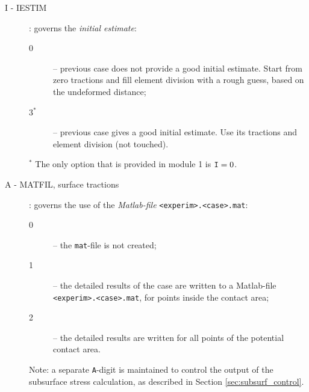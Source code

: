 \documentclass[12pt]{report}
\renewcommand{\magenta}[1]{}
\begin{document}
\begin{description}
\item[I - IESTIM] \label{i-digit} : governs the {\em initial estimate\/}:
\begin{description}
\item[0] -- previous case does not provide a good initial estimate. Start
        from zero tractions and fill element division with a rough guess,
        based on the undeformed distance;
\magenta{
\item[1$^*$] -- use previous solution, regularize tractions. The element
        division of the previous case is used as initial estimate, and the
        tractions are adjusted to this state;
\item[2$^*$] -- use normal part of previous case only. The normal tractions are
        maintained, but all elements start with zero tangential tractions,
        in the adhesion area;
}
\item[3$^*$] -- previous case gives a good initial estimate. Use its tractions
        and element division (not touched).
\end{description}
$^*$ The only option that is provided in module 1 is ${\tt I}=0$.

\item[A - MATFIL, surface tractions] \label{a-digit} : governs the use of
        the {\em Matlab-file\/} {\tt <experim>.\-<case>\-.mat}:
\begin{description}
\item[0] -- the {\tt mat}-file is not created;
\item[1] -- the detailed results of the case are written to a Matlab-file
        {\tt <experim>.<case>.mat}, for points inside the contact area;
\item[2] -- the detailed results are written for all points of the potential
        contact area.
\end{description}
Note: a separate {\tt A}-digit is maintained to control the output
of the subsurface stress calculation, as described in Section
\ref{sec:subsurf_control}.


\end{description}
\end{document}
